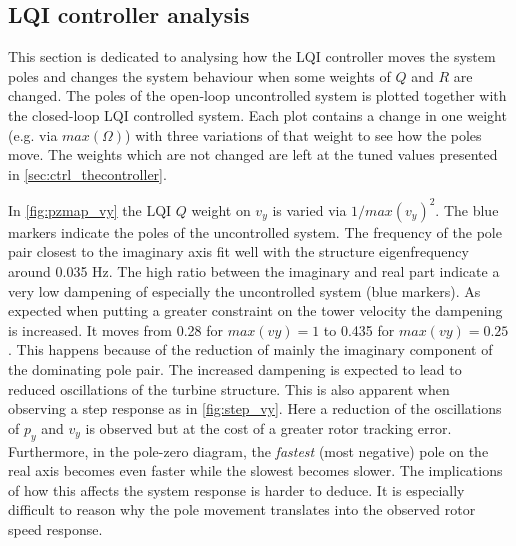 \subsection{LQI controller analysis}
This section is dedicated to analysing how the LQI controller moves the system poles and changes the system behaviour when some weights of $ Q $ and $ R $ are changed. The poles of the open-loop uncontrolled system is plotted together with the closed-loop LQI controlled system. Each plot contains a change in one weight (e.g. via $ max(\Omega) $) with three variations of that weight to see how the poles move. The weights which are not changed are left at the tuned values presented in \cref{sec:ctrl_thecontroller}. 

\smallskip
In \cref{fig:pzmap_vy} the LQI $ Q $ weight on $ v_y $ is varied via $ 1/max(v_y)^2 $. The blue markers indicate the poles of the uncontrolled system. The frequency of the pole pair closest to the imaginary axis fit well with the structure eigenfrequency around 0.035 Hz. The high ratio between the imaginary and real part indicate a very low dampening of especially the uncontrolled system (blue markers). As expected when putting a greater constraint on the tower velocity the dampening is increased. It moves from 0.28 for $ max(vy) = 1 $ to 0.435 for $ max(vy) = 0.25 $. This happens because of the reduction of mainly the imaginary component of the dominating pole pair. The increased dampening is expected to lead to reduced oscillations of the turbine structure. This is also apparent when observing a step response as in \cref{fig:step_vy}. Here a reduction of the oscillations of $ p_y $ and $ v_y $ is observed but at the cost of a greater rotor tracking error. Furthermore, in the pole-zero diagram, the \textit{fastest} (most negative) pole on the real axis becomes even faster while the slowest becomes slower. The implications of how this affects the system response is harder to deduce. It is especially difficult to reason why the pole movement translates into the observed rotor speed response.


